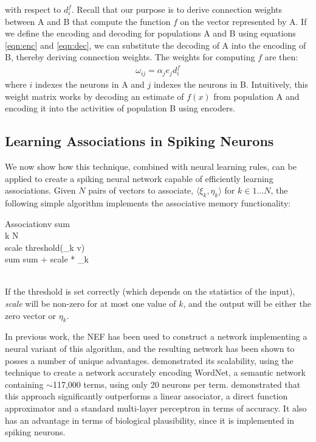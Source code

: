 \documentclass[10pt,letterpaper]{article}
\begin{document}
with respect to $d^f_i$.
Recall that our purpose is to derive connection weights between A and B that compute the function $f$ on the vector represented by A. If we define the encoding
and decoding for populations A and B using equations \eqref{eqn:enc} and \eqref{eqn:dec}, we can substitute the
decoding of A into the encoding of B, thereby deriving connection weights. The weights for computing $f$ are then:
\begin{align}
\omega_{ij} = \alpha_j e_j d^f_i \label{eqn:weight}
\end{align}
where $i$ indexes the neurons in A and $j$ indexes the neurons in B. Intuitively, this weight matrix works by decoding an estimate of $f(x)$ from population A and encoding it into the activities of population B using encoders.

\subsection{Learning Associations in Spiking Neurons}
We now show how this technique, combined with neural learning rules, can be applied to create a spiking neural network capable of efficiently learning associations. Given $N$ pairs of vectors to associate, $\langle\xi_k, \eta_k\rangle$ for $k \in 1 \dots N$, the following simple algorithm implements the associative memory functionality:
\renewcommand{\thepseudocode}{1}

\begin{pseudocode}[ruled]{Association}{v}
  \label{alg:simple}
  sum \\
  \FOR k  \TO N\\
  \BEGIN
    scale \GETS threshold(\xi_k \cdot v) \\
    sum \GETS sum + scale * \eta_k\\
  \END\\
\end{pseudocode}

If the threshold is set correctly (which depends on the statistics of the input), \textit{scale} will be non-zero for at most one value of $k$, and the output will be either the zero vector or $\eta_k$.

In previous work, the NEF has been used to construct a network implementing a neural variant of this algorithm, and the resulting network has been shown to posses a number of unique advantages. \citet{crawford2013} demonstrated its scalability, using the technique to create a network accurately encoding WordNet, a semantic network containing $\sim$117,000 terms, using only 20 neurons per term. \citet{Stewart2010} demonstrated that this approach significantly outperforms a linear associator, a direct function approximator and a standard multi-layer perceptron in terms of accuracy. It also has an advantage in terms of biological plausibility, since it is implemented in spiking neurons.
\end{document}

